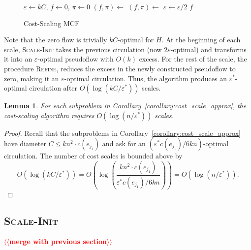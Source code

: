 \documentclass[11pt]{article}
\makeatletter
\def\eps{\varepsilon}
\theoremstyle{plain}
\newtheorem{lemma}{Lemma}[section]
\numberwithin{figure}{section}
\def\n@te#1{\textsf{\boldmath \textbf{$\langle\!\langle$#1$\rangle\!\rangle$}}\leavevmode}
\def\note#1{\textcolor{red}{\n@te{#1}}}
\makeatother
\begin{document}
\begin{figure*}[h]
\centering
\begin{minipage}{.5\linewidth}
\begin{algorithm}[H]
\caption{Cost-Scaling MCF}
\label{algorithm:cost-scaling}
\begin{algorithmic}[1]
\Function{MCF}{$H$, $\eps^*$}
	\State $\eps \gets kC$,
	$f \gets 0$,
	$\pi \gets 0$
	\While{$\eps > \eps^*/6$}
		\State $(f, \pi) \gets$ 
		\State $(f, \pi) \gets$ 
		\State $\eps \gets \eps/2$
	\EndWhile
	\State\Return $f$
\EndFunction
\end{algorithmic}
\end{algorithm}
\end{minipage}
\end{figure*}

Note that the zero flow is trivially $kC$-optimal for $H$.
At the beginning of each scale, \textsc{Scale-Init} takes the previous
circulation (now $2\eps$-optimal) and transforms it into an $\eps$-optimal
pseudoflow with $O(k)$ excess.
For the rest of the scale, the procedure \textsc{Refine}, reduces the excess in
the newly constructed pseudoflow to zero, making it an $\eps$-optimal
circulation.
Thus, the algorithm produces an $\eps^*$-optimal circulation after
$O(\log(kC/\eps^*))$ scales.

\begin{lemma}
\label{lemma:goldberg_scales}
For each subproblem in Corollary~\ref{corollary:cost_scale_approx},
the cost-scaling algorithm requires $O(\log(n/\eps^*))$ scales.
\end{lemma}

\begin{proof}
Recall that the subproblems in Corollary~\ref{corollary:cost_scale_approx} have
diameter $C \leq kn^2 \cdot c(e_{j_1})$ and ask for an
$(\eps^* c(e_{j_1})/6kn)$-optimal circulation.
The number of cost scales is bounded above by
\begin{equation*}
	O(\log(kC/\eps^*))
	= O\left(\log\left(\frac{kn^2 \cdot c(e_{j_1})}{\eps^* c(e_{j_1})/6kn}\right)\right)
	= O(\log(n/\eps^*)).
\end{equation*}
\end{proof}

\subsection{\textsc{Scale-Init}}

\note{merge with previous section}
\end{document}
